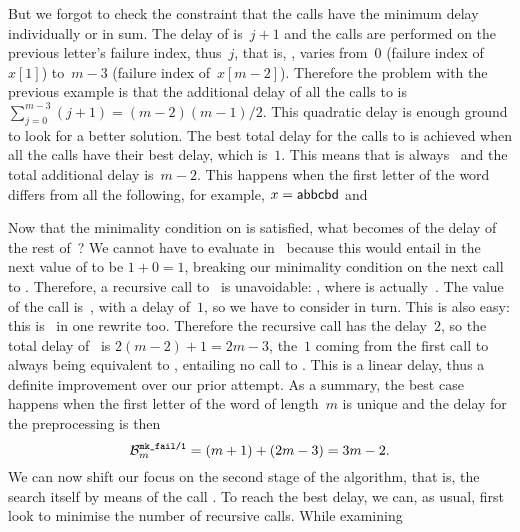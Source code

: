 But we forgot to check the constraint that the calls
 have the minimum delay individually or in
sum. The delay of  is~\(j+1\) and the calls
are performed on the previous letter's failure index, thus~\(j\), that
is, , varies from~\(0\) (failure index of~\(x[1]\))
to~\(m-3\) (failure index of~\(x[m-2]\)). Therefore the problem with
the previous example is that the additional delay of all the calls to
 is \(\sum_{j=0}^{m-3}(j+1) = (m-2)(m-1)/2\). This
quadratic delay is enough ground to look for a better solution. The
best total delay for the calls to  is achieved when all
the calls have their best delay, which is~\(1\). This means that
 is always~ and the total additional delay
is~\(m-2\). This happens when the first letter of the word differs
from all the following, for example, \(x=\word{abbcbd}\) and
\begin{center}
\end{center}
Now that the minimality condition on  is satisfied,
what becomes of the delay of the rest of~? We cannot
have  to evaluate in~ because this
would entail in  the next value of 
to be \(1+0=1\), breaking our minimality condition on the next call to
. Therefore, a recursive call to~ is
unavoidable: , where  is
actually~. The value of the call 
is~, with a delay of~\(1\), so we have to consider
 in turn. This is also easy: this is~
in one rewrite too. Therefore the recursive call has the delay~\(2\),
so the total delay of~ is \(2(m-2)+1=2m-3\), the~\(1\)
coming from the first call to  always being equivalent
to , entailing no call to . This is
a linear delay, thus a definite improvement over our prior attempt. As
a summary, the best case happens when the first letter of the word of
length~\(m\) is unique and the delay for the preprocessing is then
\[
\best{mk\_fail/1}{m} = (m + 1) + (2m-3) = 3m - 2.
\]
We can now shift our focus on the second stage of the algorithm, that
is, the search itself by means of the call
. To reach the best delay, we can, as usual,
first look to minimise the number of recursive calls. While examining
